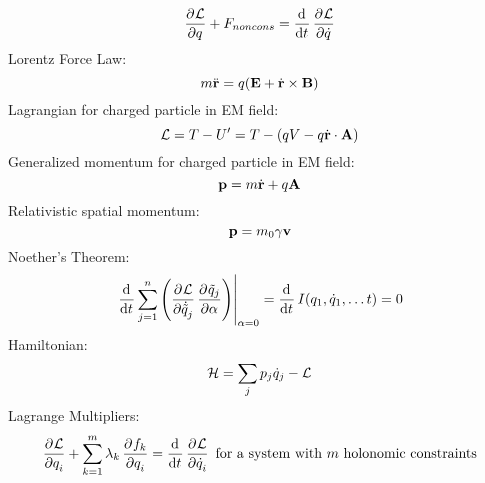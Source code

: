 \documentclass[../PHYS306Notes.tex]{subfiles}
\begin{document}
\begin{equation}
    \dpd{\LL}{q} + F_{noncons} = \dod{}{t}\dpd{\LL}{\dot{q}}   
\end{equation}
Lorentz Force Law:
\begin{equation}
    m\ddot{\mathbf{r}} = q(\mathbf{E} + \dot{\mathbf{r}} \times \mathbf{B})
\end{equation}
Lagrangian for charged particle in EM field:
\begin{equation}
    \mathcal{L} = T - U' = T - (qV - q\dot{\mathbf{r}}\cdot \mathbf{A})
\end{equation}
Generalized momentum for charged particle in EM field:
\begin{equation}
    \mathbf{p} = m\dot{\mathbf{r}} + q\mathbf{A}
\end{equation}
Relativistic spatial momentum:
\begin{equation}
    \mathbf{p} = m_0\gamma \mathbf{v}
\end{equation}
Noether's Theorem:
\begin{equation}
    \left.\dod{}{t}\sum_{j=1}^n\left(\dpd{\LL}{\dot{\tilde{q}}_j}\dpd{\tilde{q}_j}{\alpha}\right)\right|_{\alpha=0} = \dod{}{t}I(q_1, \dot{q}_1, \ldots t) = 0
\end{equation}
Hamiltonian:
\begin{equation}
    \mathcal{H} = \sum_j p_j\dot{q}_j - \mathcal{L}
\end{equation}
Lagrange Multipliers:
\begin{equation}
    \dpd{\LL}{q_i} + \sum_{k=1}^m\lambda_k \dpd{f_k}{q_i} = \dod{}{t}\dpd{\LL}{\dot{q}_i} \text{ for a system with $m$ holonomic constraints}
\end{equation}
\end{document}
